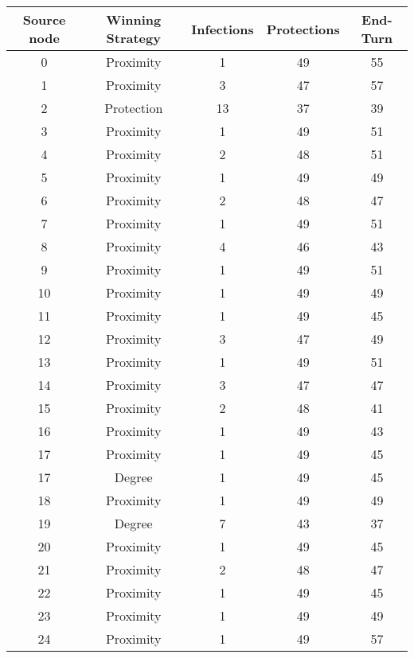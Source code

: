 \documentclass[results.tex]{subfiles}
\begin{document}
\begin{center}
  \begin{tabular}{| c || c | c | c | c |}
    \hline
    {\bfseries Source node} & {\bfseries Winning Strategy} & {\bfseries Infections} & {\bfseries Protections} & {\bfseries End-Turn} \\  %
    \hline\hline
    0 & Proximity & 1 & 49 & 55 \\ 
    \hline
    1 & Proximity & 3 & 47 & 57 \\ 
    \hline
    2 & Protection & 13 & 37 & 39 \\ 
    \hline
    3 & Proximity & 1 & 49 & 51 \\ 
    \hline
    4 & Proximity & 2 & 48 & 51 \\ 
    \hline
    5 & Proximity & 1 & 49 & 49 \\ 
    \hline
    6 & Proximity & 2 & 48 & 47 \\ 
    \hline
    7 & Proximity & 1 & 49 & 51 \\ 
    \hline
    8 & Proximity & 4 & 46 & 43 \\ 
    \hline
    9 & Proximity & 1 & 49 & 51 \\ 
    \hline
    10 & Proximity & 1 & 49 & 49 \\ 
    \hline
    11 & Proximity & 1 & 49 & 45 \\ 
    \hline
    12 & Proximity & 3 & 47 & 49 \\ 
    \hline
    13 & Proximity & 1 & 49 & 51 \\ 
    \hline
    14 & Proximity & 3 & 47 & 47 \\ 
    \hline
    15 & Proximity & 2 & 48 & 41 \\ 
    \hline
    16 & Proximity & 1 & 49 & 43 \\ 
    \hline
    17 & Proximity & 1 & 49 & 45 \\ 
    \hline
    17 & Degree & 1 & 49 & 45 \\ 
    \hline
    18 & Proximity & 1 & 49 & 49 \\ 
    \hline
    19 & Degree & 7 & 43 & 37 \\ 
    \hline
    20 & Proximity & 1 & 49 & 45 \\ 
    \hline
    21 & Proximity & 2 & 48 & 47 \\ 
    \hline
    22 & Proximity & 1 & 49 & 45 \\ 
    \hline
    23 & Proximity & 1 & 49 & 49 \\ 
    \hline
    24 & Proximity & 1 & 49 & 57 \\ 

\end{tabular}
\end{center}
\end{document}
